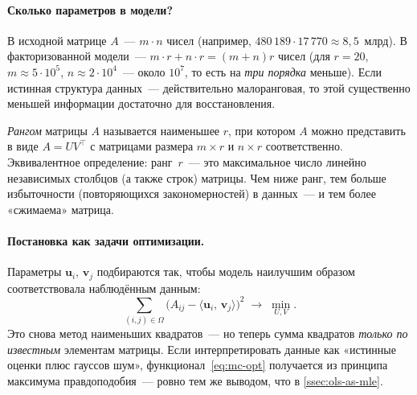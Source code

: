 \paragraph{Сколько параметров в модели?}
В исходной матрице $A$~--- $m\cdot n$ чисел (например, $480\,189\cdot 17\,770\approx 8{,}5$~млрд).
В факторизованной модели~--- $m\cdot r+n\cdot r=(m+n)r$ чисел
(для $r=20$, $m\approx 5\cdot 10^{5}$, $n\approx 2\cdot 10^{4}$~---
около $10^{7}$, то есть на \emph{три порядка} меньше). Если истинная
структура данных~--- действительно малоранговая, то этой существенно
меньшей информации достаточно для восстановления.

\begin{notebox}[title={Что значит «ранг»?}]
\emph{Рангом} матрицы $A$ называется наименьшее $r$, при котором
$A$ можно представить в виде $A=UV^{\top}$ с матрицами размера $m\times r$
и $n\times r$ соответственно. Эквивалентное определение: ранг~$r$~--- это
максимальное число линейно независимых столбцов (а также строк) матрицы.
Чем ниже ранг, тем больше избыточности (повторяющихся закономерностей) в
данных~--- и тем более «сжимаема» матрица.
\end{notebox}

\paragraph{Постановка как задачи оптимизации.}
Параметры $\mathbf u_i,\,\mathbf v_j$ подбираются так, чтобы модель
наилучшим образом соответствовала наблюдённым данным:
\begin{equation}\label{eq:mc-opt}
\sum_{(i,j)\in\Omega}\bigl(A_{ij}-\langle\mathbf u_i,\,\mathbf v_j\rangle\bigr)^{2}\;\longrightarrow\;\min_{U,V}.
\end{equation}
Это снова метод наименьших квадратов~--- но теперь сумма квадратов
\emph{только по известным} элементам матрицы. Если интерпретировать
данные как «истинные оценки плюс гауссов шум»,
функционал~\eqref{eq:mc-opt} получается из принципа максимума
правдоподобия~--- ровно тем же выводом, что в \cref{ssec:ols-as-mle}.

